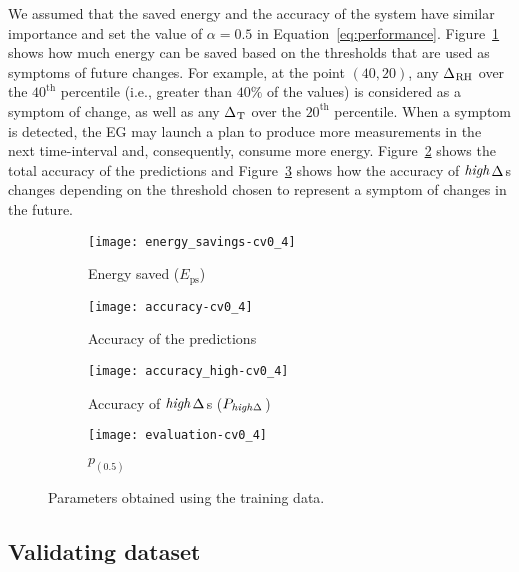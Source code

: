 \documentclass{llncs}
\newcommand{\ourDelta}[2][]{\ensuremath{\Delta\textsuperscript{\text{#1}}
\textsubscript{\text{#2}}}}
\newcommand{\high}[1][ ]{\ensuremath{\text{\emph{high}}#1}}
\newcommand{\highDelta}[2][]{\high{\ourDelta[#1]{#2}}}
\begin{document}
We assumed that the saved energy and the accuracy of the system have similar 
importance and set the value of $\alpha = 0.5$ in Equation~\ref{eq:performance}.
Figure~\ref{fig:performance-energy-consumption} shows how much energy can be 
saved based on the thresholds that are used as symptoms of future changes. For 
example, at the point $(40, 20)$, any \ourDelta{RH} over the $40^\text{th}$ 
percentile (i.e., greater than $40\%$ of the values) is considered as a symptom 
of change, as well as any \ourDelta{T} over the $20^\text{th}$ percentile. When 
a symptom is detected, the EG may launch a plan to produce more measurements in 
the next time-interval and, consequently, consume more energy.
Figure~\ref{fig:performance-accuracy} shows the total accuracy of the 
predictions and Figure~\ref{fig:performance-high-accuracy} shows how the 
accuracy of \highDelta{}s changes depending on the threshold chosen to represent 
a symptom of changes in the future.

\begin{figure}[h]
	\centering
	\begin{subfigure}[t]{0.21\textwidth}
		\centering
		
\texttt{[image: energy\_savings-cv0\_4]}
		\caption{Energy saved ($E_\text{ps}$)}
		\label{fig:performance-energy-consumption}
	\end{subfigure}\qquad
	\begin{subfigure}[t]{0.21\textwidth}
		\centering
\texttt{[image: accuracy-cv0\_4]}
		\caption{Accuracy of the predictions}
		\label{fig:performance-accuracy}
	\end{subfigure}\qquad
	\begin{subfigure}[t]{0.21\textwidth}
		\centering
		
\texttt{[image: accuracy\_high-cv0\_4]}
		\caption{Accuracy of \highDelta{}s ($P_\text{\highDelta{}}$)}
		\label{fig:performance-high-accuracy}
	\end{subfigure}\qquad
	\begin{subfigure}[t]{0.21\textwidth}
		\centering
		
\texttt{[image: evaluation-cv0\_4]}
		\caption{$p_{(0.5)}$}
		\label{fig:performance-score}
	\end{subfigure}\caption{Parameters obtained using the training data.}
	\label{fig:performance-process}

\end{figure}


\subsection{Validating dataset}
\end{document}

